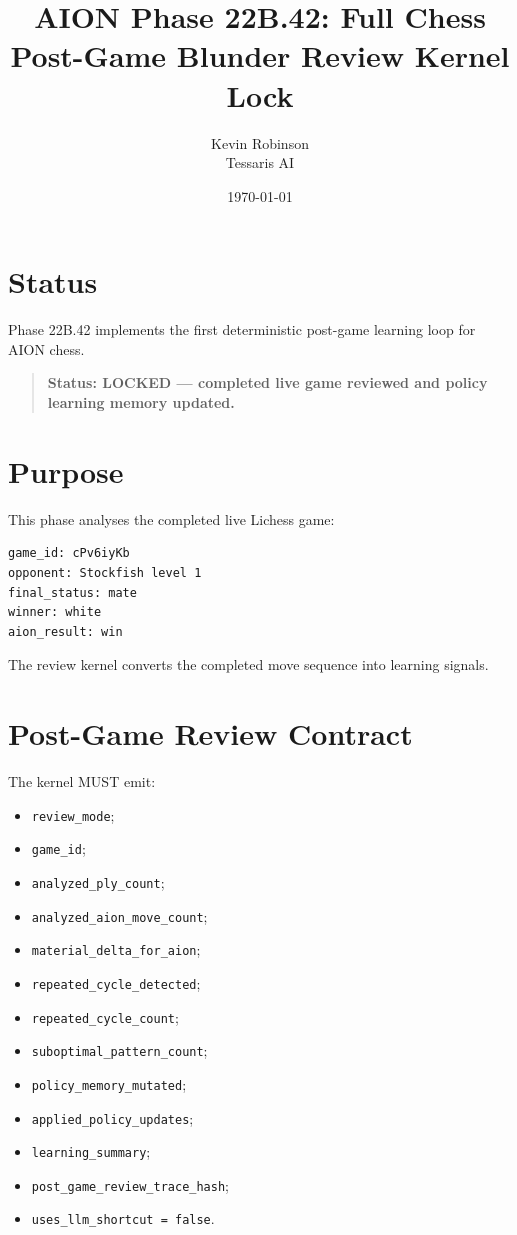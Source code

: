 \documentclass[11pt,a4paper]{article}
\title{\textbf{AION Phase 22B.42: Full Chess Post-Game Blunder Review Kernel Lock}}
\author{Kevin Robinson\\Tessaris AI}
\date{\today}
\begin{document}
\maketitle

\section{Status}

Phase 22B.42 implements the first deterministic post-game learning loop for AION chess.

\begin{quote}
\textbf{Status: LOCKED --- completed live game reviewed and policy learning memory updated.}
\end{quote}

\section{Purpose}

This phase analyses the completed live Lichess game:

\begin{verbatim}
game_id: cPv6iyKb
opponent: Stockfish level 1
final_status: mate
winner: white
aion_result: win
\end{verbatim}

The review kernel converts the completed move sequence into learning signals.

\section{Post-Game Review Contract}

The kernel MUST emit:

\begin{itemize}
  \item \texttt{review\_mode};
  \item \texttt{game\_id};
  \item \texttt{analyzed\_ply\_count};
  \item \texttt{analyzed\_aion\_move\_count};
  \item \texttt{material\_delta\_for\_aion};
  \item \texttt{repeated\_cycle\_detected};
  \item \texttt{repeated\_cycle\_count};
  \item \texttt{suboptimal\_pattern\_count};
  \item \texttt{policy\_memory\_mutated};
  \item \texttt{applied\_policy\_updates};
  \item \texttt{learning\_summary};
  \item \texttt{post\_game\_review\_trace\_hash};
  \item \texttt{uses\_llm\_shortcut = false}.
\end{itemize}
\end{document}
